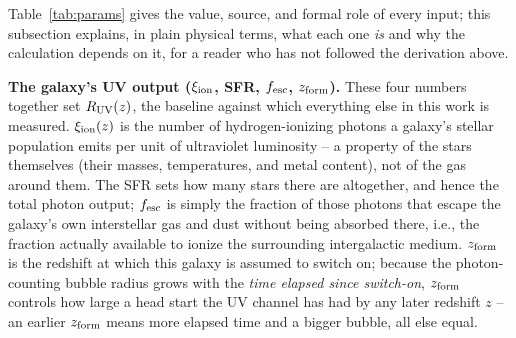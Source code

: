\documentclass[11pt,a4paper]{article}
\begin{document}
Table~\ref{tab:params} gives the value, source, and formal role of every input; this
subsection explains, in plain physical terms, what each one \emph{is} and why the calculation
depends on it, for a reader who has not followed the derivation above.

\textbf{The galaxy's UV output ($\xi_{\rm ion}$, SFR, $f_{\rm esc}$, $z_{\rm form}$).} These
four numbers together set $R_{\rm UV}(z)$, the baseline against which everything else in this
work is measured. $\xi_{\rm ion}(z)$ is the number of hydrogen-ionizing photons a galaxy's
stellar population emits per unit of ultraviolet luminosity -- a property of the stars
themselves (their masses, temperatures, and metal content), not of the gas around them. The
SFR sets how many stars there are altogether, and hence the total photon output; $f_{\rm esc}$
is simply the fraction of those photons that escape the galaxy's own interstellar gas and dust
without being absorbed there, i.e., the fraction actually available to ionize the surrounding
intergalactic medium. $z_{\rm form}$ is the redshift at which this galaxy is assumed to switch
on; because the photon-counting bubble radius grows with the \emph{time elapsed since
switch-on}, $z_{\rm form}$ controls how large a head start the UV channel has had by any later
redshift $z$ -- an earlier $z_{\rm form}$ means more elapsed time and a bigger bubble, all else
equal.
\end{document}
